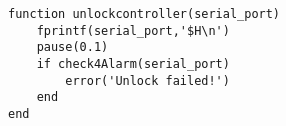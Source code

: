 \begin{lstlisting}
function unlockcontroller(serial_port)
    fprintf(serial_port,'$H\n')
    pause(0.1)
    if check4Alarm(serial_port)
        error('Unlock failed!')
    end
end

\end{lstlisting}